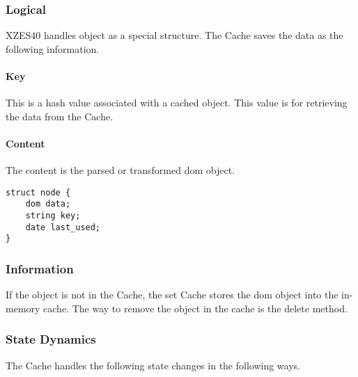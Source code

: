 \subsubsection{Logical}

XZES40 handles object as a special structure.
The Cache saves the data as the following information.

\paragraph{Key}
This is a hash value associated with a cached object.
This value is for retrieving the data from the Cache.

\paragraph{Content}
The content is the parsed or transformed \gls{dom} object.

\begin{lstlisting}
struct node {
	dom data;
    string key;
    date last_used;
}
\end{lstlisting}

\subsubsection{Information}

If the object is not in the Cache, the set Cache stores the \gls{dom} object into the in-memory cache. 
The way to remove the object in the cache is the delete method.

\subsubsection{State Dynamics}

The Cache handles the following state changes in the following ways.

